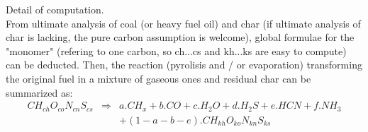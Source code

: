 Detail of computation.\\
From ultimate analysis of coal (or heavy fuel oil) and char (if ultimate
analysis of char is lacking, the pure carbon assumption is welcome), global
formulae for the "monomer" (refering to one carbon, so ch...cs and kh...ks are
easy to compute) can be deducted. Then, the reaction (pyrolisis and / or
evaporation) transforming the original fuel in a mixture of gaseous ones and
residual char can be summarized as:
\begin{eqnarray}
CH_{ch}O_{co}N_{cn}S_{cs} & \Rightarrow & a . CH_{x} + b . CO + c . H_{2}O + d . H_{2}S + e . HCN + f . NH_{3} \nonumber \\
                          &             & + (1-a-b-e) . CH_{kh}O_{ko}N_{kn}S_{ks}
\end{eqnarray} 

